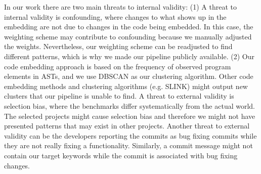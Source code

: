 In our work there are two main threats to internal validity: (1) A threat to internal validity is confounding, where changes to what shows up in the embedding are not due to changes in the code being embedded. In this case, the weighting scheme may contribute to confounding because we manually adjusted the weights. Nevertheless, our weighting scheme can be readjusted to find different patterns, which is why we made our pipeline publicly available. (2) Our code embedding approach is based on the frequency of observed program elements in ASTs, and we use DBSCAN as our clustering algorithm. Other code embedding methods and clustering algorithms (e.g. SLINK) might output new clusters that our pipeline is unable to find. A threat to external validity is selection bias, where the benchmarks differ systematically from the actual world. The selected projects might cause selection bias and therefore we might not have presented patterns that may exist in other projects. Another threat to external validity can be the developers reporting the commits as bug fixing commits while they are not really fixing a functionality. Similarly, a commit message might not contain our target keywords while the commit is associated with bug fixing changes.
